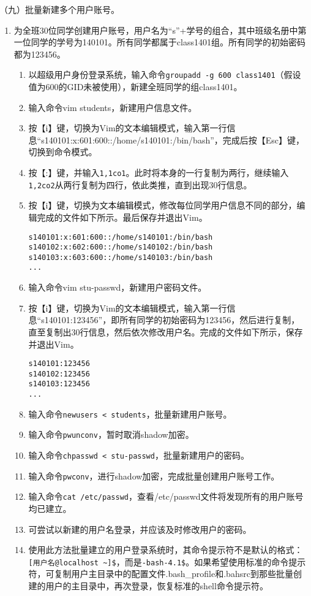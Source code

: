 \vspace{0.1in}
（九）批量新建多个用户账号。
\begin{enumerate}
  \item 为全班30位同学创建用户账号，用户名为“s”+学号的组合，其中班级名册中第一位同学的学号为140101。所有同学都属于class1401组。所有同学的初始密码都为123456。
    \begin{enumerate}
      \item 以超级用户身份登录系统，输入命令\verb|groupadd -g 600 class1401|（假设值为600的GID未被使用），新建全班同学的组class1401。
      \item 输入命令vim students，新建用户信息文件。
      \item 按【i】键，切换为Vim的文本编辑模式，输入第一行信息“s140101:x:601:600::/home/s140101:/bin/bash”，完成后按【Esc】键，切换到命令模式。
      \item 按【:】键，并输入\verb|1,1co1|。此时将本身的一行复制为两行，继续输入\verb|1,2co2|从两行复制为四行，依此类推，直到出现30行信息。
      \item 按【i】键，切换为文本编辑模式，修改每位同学用户信息不同的部分，编辑完成的文件如下所示。最后保存并退出Vim。
\begin{verbatim}
s140101:x:601:600::/home/s140101:/bin/bash
s140102:x:602:600::/home/s140102:/bin/bash
s140103:x:603:600::/home/s140103:/bin/bash
...
\end{verbatim}
      \item 输入命令vim stu-passwd，新建用户密码文件。
      \item 按【i】键，切换为Vim的文本编辑模式，输入第一行信息“s140101:123456”，即所有同学的初始密码为123456，然后进行复制，直至复制出30行信息，然后依次修改用户名。完成的文件如下所示，保存并退出Vim。
\begin{verbatim}
s140101:123456
s140102:123456
s140103:123456
...
\end{verbatim}
      \item 输入命令\verb|newusers < students|，批量新建用户账号。
      \item 输入命令\verb|pwunconv|，暂时取消shadow加密。
      \item 输入命令\verb|chpasswd < stu-passwd|，批量新建用户的密码。
      \item 输入命令\verb|pwconv|，进行shadow加密，完成批量创建用户账号工作。
      \item 输入命令\verb|cat /etc/passwd|，查看/etc/passwd文件将发现所有的用户账号均已建立。
      \item 可尝试以新建的用户名登录，并应该及时修改用户的密码。
      \item 使用此方法批量建立的用户登录系统时，其命令提示符不是默认的格式：\verb|[用户名@localhost ~]$|，而是\verb|-bash-4.1$|。如果希望使用标准的命令提示符，可复制用户主目录中的配置文件.bash\_profile和.bahsrc到那些批量创建的用户的主目录中，再次登录，恢复标准的shell命令提示符。
    \end{enumerate}
\end{enumerate}

